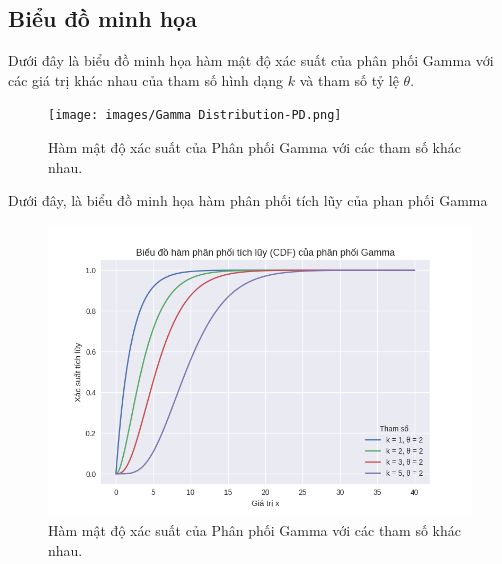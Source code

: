 	\subsection{Biểu đồ minh họa}
	Dưới đây là biểu đồ minh họa hàm mật độ xác suất của phân phối Gamma với các giá trị khác nhau của tham số hình dạng $k$ và tham số tỷ lệ $\theta$.
	
	\begin{figure}[h!]
		\centering
		\texttt{[image: images/Gamma Distribution-PD.png]} %
		\caption{Hàm mật độ xác suất của Phân phối Gamma với các tham số khác nhau.}
		\label{fig:Gamma Distribution-PDF}
	\end{figure}
	
	Dưới đây, là biểu đồ minh họa hàm phân phối tích lũy của phan phối Gamma
	
		\begin{figure}[h!]
		\centering
		\includegraphics[width=0.7\tetextwidth]{images/Gamma Distribution-CDF.png} %
		\caption{Hàm mật độ xác suất của Phân phối Gamma với các tham số khác nhau.}
		\label{fig:Gamma Distribution-CDF}
	\end{figure}
	
